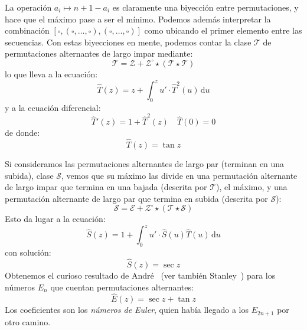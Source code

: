   La operación \(a_i \mapsto n + 1 - a_i\)
  es claramente una biyección entre permutaciones,
  y hace que el máximo pase a ser el mínimo.
  Podemos además interpretar la combinación
  \([\square,
       (\square, \dotsc, \square),
       (\square, \dotsc, \square)]\)
  como ubicando el primer elemento entre las secuencias.
  Con estas biyecciones en mente,
  podemos contar la clase \(\mathcal{T}\)
  de permutaciones alternantes de largo impar mediante:
  \begin{equation}
    \label{eq:class-alternating-odd}
    \mathcal{T}
      = \mathcal{Z}
	  + \mathcal{Z}^\square
	      \star (\mathcal{T} \star \mathcal{T})
  \end{equation}
  lo que lleva a la ecuación:
  \begin{equation*}
    \widehat{T}(z)
      = z + \int_0^z u' \cdot \widehat{T}^2(u) \, \mathrm{d} u
  \end{equation*}
  y a la ecuación diferencial:
  \begin{equation*}
    \widehat{T}'(z)
      = 1 + \widehat{T}^2(z)
    \quad \widehat{T}(0) = 0
  \end{equation*}
  de donde:
  \begin{equation}
    \label{eq:egf-alternating-odd}
    \widehat{T}(z)
      = \tan z
  \end{equation}

  Si consideramos las permutaciones alternantes de largo par
  (terminan en una subida),
  clase \(\mathcal{S}\),
  vemos que su máximo las divide en una permutación alternante de largo impar
  que termina en una bajada
  (descrita por \(\mathcal{T}\)),
  el máximo,
  y una permutación alternante de largo par
  que termina en subida
  (descrita por \(\mathcal{S}\)):
  \begin{equation}
    \label{eq:class-alternating-even}
    \mathcal{S}
      = \mathcal{E}
	  + \mathcal{Z}^\square
	      \star (\mathcal{T} \star \mathcal{S})
  \end{equation}
  Esto da lugar a la ecuación:
  \begin{equation*}
    \widehat{S}(z)
      = 1 + \int_0^z u' \cdot \widehat{S}(u) \widehat{T}(u)
	      \, \mathrm{d} u
  \end{equation*}
  con solución:
  \begin{equation}
    \label{eq:egf-alternating-even}
    \widehat{S}(z)
      = \sec z
  \end{equation}
  Obtenemos el curioso resultado de André~%
    \cite{andre81:_sur_permut_alter}
  (ver también Stanley~\cite{stanley09:_survey_alter_permut})
  para los números \(E_n\) que cuentan permutaciones alternantes:
  \begin{equation}
    \label{eq:egf-Euler-numbers}
    \widehat{E}(z)
      = \sec z + \tan z
  \end{equation}
  Los coeficientes son los \emph{números de Euler},%
  quien había llegado a los \(E_{2 n + 1}\) por otro camino.

